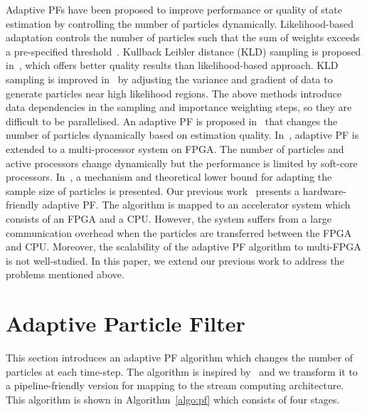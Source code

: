 Adaptive PFs have been proposed to improve performance or quality of state estimation by controlling the number of particles dynamically. 
Likelihood-based adaptation controls the number of particles such that the sum of weights exceeds a pre-specified threshold~\cite{koller98}.
Kullback Leibler distance (KLD) sampling is proposed in~\cite{fox03}, which offers better quality results than likelihood-based approach. 
KLD sampling is improved in~\cite{park10} by adjusting the variance and gradient of data to generate particles near high likelihood regions. 
The above methods introduce data dependencies in the sampling and importance weighting steps, so they are difficult to be parallelised. 
An adaptive PF is proposed in~\cite{bolic02} that changes the number of particles dynamically based on estimation quality. 
In~\cite{chau12}, adaptive PF is extended to a multi-processor system on FPGA.
The number of particles and active processors change dynamically but the performance is limited by soft-core processors.
In~\cite{liu07}, a mechanism and theoretical lower bound for adapting the sample size of particles is presented.
Our previous work~\cite{chau13a} presents a hardware-friendly adaptive PF. 
The algorithm is mapped to an accelerator system which consists of an FPGA and a CPU.
However, the system suffers from a large communication overhead when the particles are transferred between the FPGA and CPU.
Moreover, the scalability of the adaptive PF algorithm to multi-FPGA is not well-studied.
In this paper, we extend our previous work to address the problems mentioned above.

\section{Adaptive Particle Filter}
\label{sec:apf}

This section introduces an adaptive PF algorithm which changes the number of particles at each time-step.
The algorithm is inspired by~\cite{liu07} and we transform it to a pipeline-friendly version for mapping to the stream computing architecture.
This algorithm is shown in Algorithm~\ref{algo:pf} which consists of four stages.

